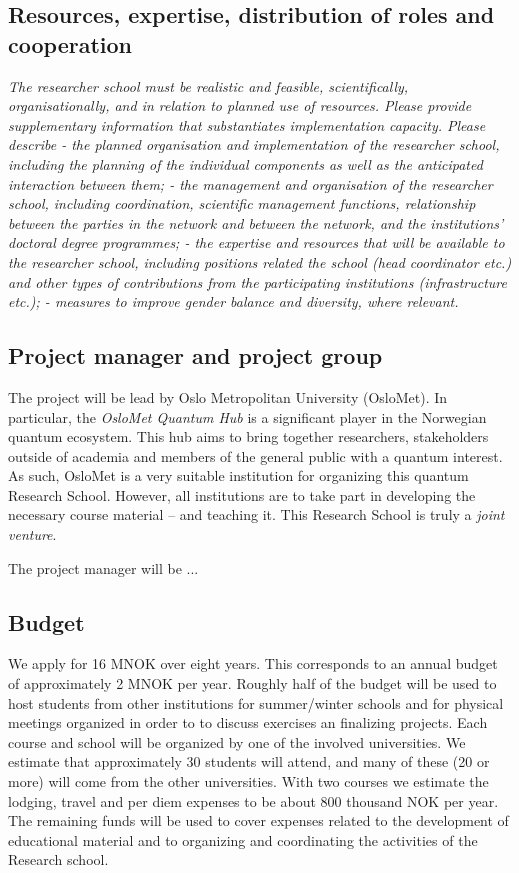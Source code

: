 \documentclass{scrreprt}
\begin{document}
\subsection{Resources, expertise, distribution of roles and cooperation}

\textit{The researcher school must be realistic and feasible, scientifically, organisationally, and in relation to planned use of resources. Please provide supplementary information that substantiates implementation capacity. Please describe
-	the planned organisation and implementation of the researcher school, including the planning of the individual components as well as the anticipated interaction between them;  
-	the management and organisation of the researcher school, including coordination, scientific management functions, relationship between the parties in the network and between the network, and the institutions’ doctoral degree programmes;  
-	the expertise and resources that will be available to the researcher school, including positions related the school (head coordinator etc.) and other types of contributions from the participating institutions (infrastructure etc.);
-	measures to improve gender balance and diversity, where relevant.}

\subsection{Project manager and project group}
The project will be lead by Oslo Metropolitan University (OsloMet). In particular, the \textit{OsloMet Quantum Hub} is a significant player in the Norwegian quantum ecosystem. This hub aims to bring together researchers, stakeholders outside of academia and members of the general public with a quantum interest. As such, OsloMet is a very suitable institution for organizing this quantum Research School. However, all institutions are to take part in developing the necessary course material -- and teaching it. This Research School is truly a \textit{joint venture}.

The project manager will be ...


\subsection{Budget}

We apply for 16 MNOK over eight years. This corresponds to an annual budget of approximately 2 MNOK per year. Roughly half of the budget will be used to host students from other institutions for summer/winter schools and for physical meetings organized in order to to discuss exercises an finalizing projects. Each course and school will be organized by one of the involved universities. We estimate that approximately 30 students will attend, and many of these (20 or more) will come from the other universities. With two courses we estimate the lodging, travel and per diem expenses to be about 800 thousand NOK per year. The remaining funds will be used to cover expenses related to the development of educational material and to organizing and coordinating the activities of the Research school.
\end{document}
